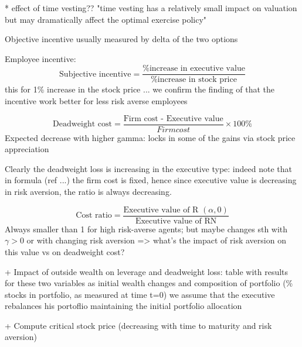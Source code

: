 

* effect of time vesting?? "time vesting has a relatively small impact on valuation but may dramatically affect the optimal exercise policy" \cite{dybvig2003employee}

Objective incentive usually measured by delta of the two options

Employee incentive: $$\text{Subjective incentive} = \frac{\text{\%  increase in executive value}}{\text{\% increase in stock price}} $$
    this for 1\% increase in the stock price
    ... we confirm the finding of \cite{lau2005valuation} that the incentive work better for less risk averse employees 

$$ \text{Deadweight cost} = \frac{\text{Firm cost - Executive value}}{Firm cost} \times 100\%  $$
    Expected decrease with higher gamma: locks in some of the gains via stock price appreciation

    Clearly the deadweight loss is increasing in the executive type: indeed note that in formula (ref ...)  the firm cost is fixed, hence since executive value is decreasing in risk aversion, the ratio is always decreasing.

$$\text{Cost ratio} = \frac{\text{Executive value of R }(\alpha, 0)}{\text{Executive value of RN}}$$
    Always smaller than 1 for high risk-averse agents; but maybe changes sth with $\gamma > 0$ or with changing risk aversion
    => what's the impact of risk aversion on this value vs on deadweight cost?


+ Impact of outside wealth on leverage and deadweight loss: table with results for these two variables as initial wealth changes and composition of portfolio (\% stocks in portfolio, as measured at time t=0)
    we assume that the executive rebalances his portoflio maintaining the initial portfolio allocation 

+ Compute critical stock price (decreasing with time to maturity and risk aversion)






